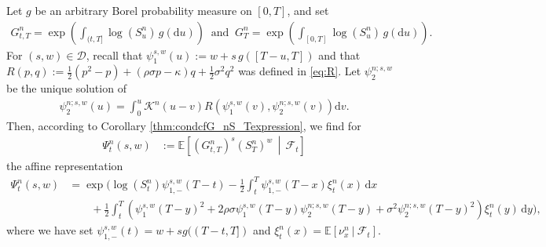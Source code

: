 \documentclass[10pt,a4paper,reqno]{amsart}
\theoremstyle{plain}
\theoremstyle{definition}
\theoremstyle{remark}
\theoremstyle{example}
\begin{document}
Let $g$ be an arbitrary Borel probability measure on $[0,T]$, and set
\begin{align}\label{eq:lifted-general-geometric-average}
    G_{t,T}^n = \exp\left( \int_{(t,T]} \log(S_u^n)\, g(\mathrm{d}u) \right) \ \text{ and } \ G_T^n = \exp\left( \int_{[0,T]} \log(S_u^n)\,g(\mathrm du) \right).
\end{align}
For $(s,w)\in\mathcal D$, recall that $\psi_1^{s,w}(u) := w+s\,g([T-u,T])$ and that $R(p,q) := \frac12(p^2-p) + (\rho\sigma p-\kappa)q + \frac12\sigma^2q^2$ was defined in \eqref{eq:R}. Let $\psi_2^{n;s,w}$ be the unique solution of 
\begin{align}\label{eq:lifted-Volterra-Riccati-equivalence}
    \psi_2^{n;s,w}(u) = \int_0^u \mathcal K^n(u-v) R\left( \psi_1^{s,w}(v), \psi_2^{n;s,w}(v) \right) \mathrm dv.
\end{align}
Then, according to Corollary \ref{thm:condcfG_nS_Texpression}, we find for 
\begin{align}\label{eq:lifted-Hsw-definition}
    \Psi_t^n(s,w) &:= \mathbb E\left[ (G_{t,T}^n)^s(S_T^n)^w \,\middle|\, \mathcal F_t \right]
\end{align}
the affine representation
\begin{align*}
    \Psi_t^n(s,w) &= \exp\Bigg( \log(S^n_t) \psi_{1,-}^{s,w}(T-t) - \frac{1}{2} \int_t^T \psi_{1,-}^{s,w}(T-x)\xi^n_t(x)\, \mathrm{d}x
    \\ &\qquad + \frac{1}{2}\int_t^T \left( \psi_1^{s,w}(T-y)^2 + 2\rho \sigma \psi_1^{s,w}(T-y)\psi_2^{n;s,w}(T-y) + \sigma^2 \psi_2^{n;s,w}(T-y)^2\right)\xi_t^n(y)\, \mathrm{d}y\Bigg),
\end{align*}
where we have set $\psi_{1,-}^{s,w}(t) = w + s g((T-t,T])$ and $\xi^n_t(x) = \mathbb{E}[ \nu_x^n \ | \ \mathcal{F}_t]$. 
\end{document}
